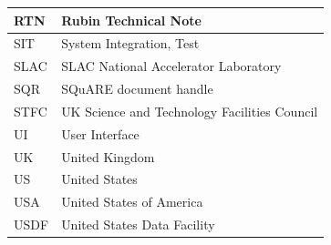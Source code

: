 \begin{longtable}{p{}p{}}
RTN & Rubin Technical Note \\\hline
SIT & System Integration, Test \\\hline
SLAC & SLAC National Accelerator Laboratory \\\hline
SQR & SQuARE document handle \\\hline
STFC & UK Science and Technology Facilities Council \\\hline
UI & User Interface \\\hline
UK & United Kingdom \\\hline
US & United States \\\hline
USA & United States of America \\\hline
USDF & United States Data Facility \\\hline
\end{longtable}
